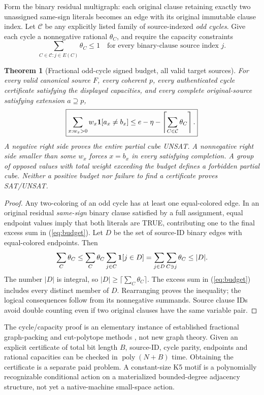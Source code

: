 \documentclass[11pt]{article}
\newtheorem{theorem}{Theorem}
\begin{document}
Form the binary residual multigraph: each original clause retaining exactly two unassigned same-sign literals becomes an edge with its original immutable clause index. Let $\mathcal C$ be any explicitly listed family of source-indexed \emph{odd cycles}. Give each cycle a nonnegative rational $\theta_C$, and require the capacity constraints
\[
\sum_{C\in\mathcal C:j\in E(C)}\theta_C\le1
\quad\text{for every binary-clause source index }j.
\]

\begin{theorem}[Fractional odd-cycle signed budget, all valid target sources]
For every valid canonical source $F$, every coherent $p$, every authenticated cycle certificate satisfying the displayed capacities, and every complete original-source satisfying extension $a\supseteq p$,
\[
\boxed{\sum_{x:w_x>0}w_x{\bf1}[a_x\neq b_x]
\le e-\eta-\left\lceil\sum_{C\in\mathcal C}\theta_C\right\rceil.}
\]
A negative right side proves the entire partial cube UNSAT. A nonnegative right side smaller than some $w_x$ forces $x=b_x$ in every satisfying completion. A group of opposed values with total weight exceeding the budget defines a forbidden partial cube. Neither a positive budget nor failure to find a certificate proves SAT/UNSAT.
\end{theorem}
\begin{proof}
Any two-coloring of an odd cycle has at least one equal-colored edge. In an original residual \emph{same-sign} binary clause satisfied by a full assignment, equal endpoint values imply that both literals are TRUE, contributing one to the final excess sum in (\ref{eq:budget}). Let $D$ be the set of source-ID binary edges with equal-colored endpoints. Then
\[
\sum_C\theta_C\le
\sum_C\theta_C\sum_{j\in C}{\bf1}[j\in D]
=\sum_{j\in D}\sum_{C\ni j}\theta_C\le |D|.
\]
The number $|D|$ is integral, so $|D|\ge\lceil\sum_C\theta_C\rceil$. The excess sum in (\ref{eq:budget}) includes every distinct member of $D$. Rearranging proves the inequality; the logical consequences follow from its nonnegative summands. Source clause IDs avoid double counting even if two original clauses have the same variable pair.
\end{proof}

The cycle/capacity proof is an elementary instance of established fractional graph-packing and cut-polytope methods \cite{barahona1985,boros1992,geelen2002}, not new graph theory. Given an explicit certificate of total bit length $B$, source-ID, cycle parity, endpoints and rational capacities can be checked in $\operatorname{poly}(N+B)$ time. Obtaining the certificate is a separate paid problem. A constant-size K5 motif is a polynomially recognizable conditional action on a materialized bounded-degree adjacency structure, not yet a native-machine small-space action.
\end{document}
